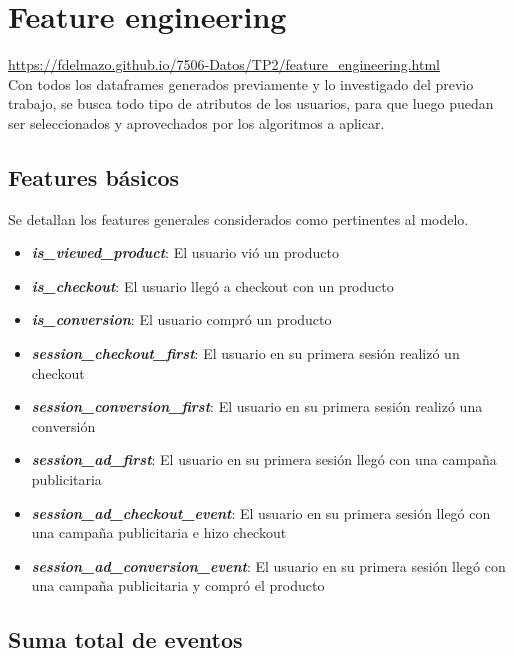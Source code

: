 \documentclass[a4paper]{article}
\begin{document}
\section{Feature engineering}

\url{https://fdelmazo.github.io/7506-Datos/TP2/feature_engineering.html} \\

Con todos los dataframes generados previamente y lo investigado del previo trabajo, se busca todo tipo de atributos de los usuarios, para que luego puedan ser seleccionados y aprovechados por los algoritmos a aplicar.

\subsection{Features básicos}
Se detallan los features generales considerados como pertinentes al modelo.

\begin{itemize}
	\item \textbf{\textit{is\_viewed\_product}}: El usuario vió un producto
	\item \textbf{\textit{is\_checkout}}: El usuario llegó a checkout con un producto
	\item \textbf{\textit{is\_conversion}}: El usuario compró un producto
	\item \textbf{\textit{session\_checkout\_first}}: El usuario en su primera sesión realizó un checkout
	\item \textbf{\textit{session\_conversion\_first}}: El usuario en su primera sesión realizó una conversión
	\item \textbf{\textit{session\_ad\_first}}: El usuario en su primera sesión llegó con una campaña publicitaria
	\item \textbf{\textit{session\_ad\_checkout\_event}}: El usuario en su primera sesión llegó con una campaña publicitaria e hizo checkout
	\item \textbf{\textit{session\_ad\_conversion\_event}}: El usuario en su primera sesión llegó con una campaña publicitaria y compró el producto	
\end{itemize}	
	
\subsection{Suma total de eventos}
\end{document}
